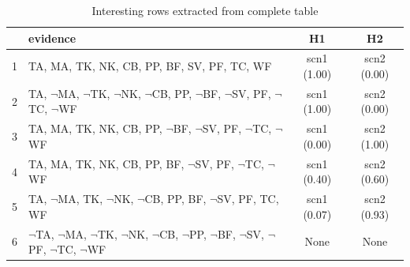\documentclass[12pt]{article}
\begin{document}
\begin{table}[htbp]
\begin{center}
\begin{tabular}{|l|l|c|c|}
\hline
 & evidence & H1 & H2  \\
\hline
1 & TA, MA, TK, NK, CB, PP, BF, SV, PF, TC, WF & scn1 (1.00) & scn2 (0.00)\\
2 & TA, $\neg$MA, $\neg$TK, $\neg$NK, $\neg$CB, PP, $\neg$BF, $\neg$SV, PF, $\neg$TC, $\neg$WF & scn1 (1.00) & scn2 (0.00)\\
3 & TA, MA, TK, NK, CB, PP, $\neg$BF, $\neg$SV, PF, $\neg$TC, $\neg$WF & scn1 (0.00) & scn2 (1.00)\\
4 & TA, MA, TK, NK, CB, PP, BF, $\neg$SV, PF, $\neg$TC, $\neg$WF & scn1 (0.40) & scn2 (0.60)\\
5 & TA, $\neg$MA, TK, $\neg$NK, $\neg$CB, PP, BF, $\neg$SV, PF, TC, WF & scn1 (0.07) & scn2 (0.93)\\
6 & $\neg$TA, $\neg$MA, $\neg$TK, $\neg$NK, $\neg$CB, $\neg$PP, $\neg$BF, $\neg$SV, $\neg$PF, $\neg$TC, $\neg$WF & None & None\\

\hline
\end{tabular}
\end{center}
\caption{ Interesting rows extracted from complete table}
\label{cases}
\end{table}
\end{document}

